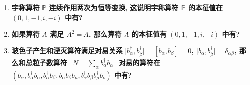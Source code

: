 \documentclass[../../main.tex]{subfiles}
\begin{document}
\begin{enumerate}
  \item \textbf{宇称算符 $\mathbb{P}$ 连续作用两次为恒等变换, 这说明宇称算符 $\mathbb{P}$ 的本征值在 $(0,1,-1,i,-i)$ 中有?}
  
{}
  
  \item \textbf{如果算符 $A$ 满足 $A^{2} = A$, 那么算符 $A$ 的本征值有 $(0,1,-1,i,-i)$ 中有?}
  
{}
  
  \item \textbf{玻色子产生和湮灭算符满足对易关系 $\bigg[b^{\dagger}_{\alpha}, b^{\dagger}_{\beta}\bigg] = [b_{\alpha},b_{\beta}] = 0$, $\bigg[b_{\alpha}, b_{\beta}^{\dagger}\bigg] = \delta_{\alpha\beta}$, 那么和总粒子数算符 $\begin{aligned}
    N = \sum_{\alpha}b^{\dagger}_{\alpha}b_{\alpha}
  \end{aligned}$ 对易的算符在 $(b_{\alpha}, b_{\alpha}^{\dagger}b_{\alpha}, b_{\alpha}^{\dagger}b_{\beta}, b_{\alpha}^{\dagger}b_{\beta}b_{\mu}, b_{\alpha}^{\dagger}b_{\beta}b_{\mu}^{\dagger}b_{\nu})$ 中有?}
  

\end{enumerate}
\end{document}
